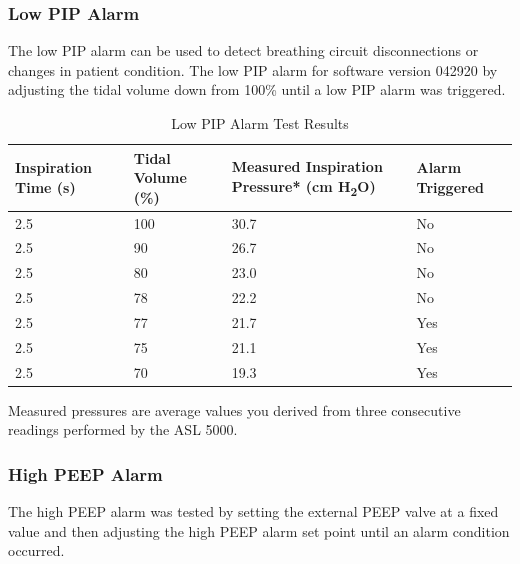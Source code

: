 \documentclass[]{article}
\begin{document}
\subsubsection{Low PIP Alarm}
The low PIP alarm can be used to detect breathing circuit disconnections or changes in patient condition.  The low PIP alarm for software version 042920 by adjusting the tidal volume down from 100\% until a low PIP alarm was triggered.  

\begin{center}
	\begin{table}[h]
		\caption{Low PIP Alarm Test Results}
		\label{tab:low_pip_test}
		\begin{tabular}{ |p{3.7cm}|p{3.3cm}|p{4cm}| p{2.9cm}|}
			
			\hline
			\textbf{Inspiration Time (s)} & \textbf{Tidal Volume (\%)} & \textbf{Measured Inspiration Pressure* (cm H\textsubscript{2}O)} & \textbf{Alarm Triggered}  \\ \hline
			2.5 & 100 & 30.7 & No\\ \hline
			2.5 & 90 & 26.7 & No\\ \hline
			2.5 & 80 & 23.0 & No\\ \hline
			2.5 & 78 & 22.2 & No\\ \hline
			2.5 & 77 & 21.7 & Yes\\ \hline
			2.5 & 75 & 21.1 & Yes\\ \hline
			2.5 & 70 & 19.3 & Yes\\ \hline
		\end{tabular}

	\noindent *Measured pressures are average values you derived from three consecutive readings performed by the ASL 5000.
	\end{table}	
\end{center}

\subsubsection{High PEEP Alarm}

The high PEEP alarm was tested by setting the external PEEP valve at a fixed value and then adjusting the high PEEP alarm set point until an alarm condition occurred.
\end{document}
